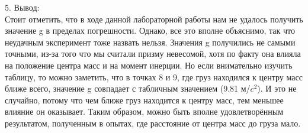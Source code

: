\documentclass[12pt, a4paper]{article}
\begin{document}
    
            {\Large 5. Вывод: \\}
            Стоит отметить, что в ходе данной лабораторной работы нам не удалось получить значение g
            в пределах погрешности. Однако, все это вполне объяснимо, так что неудачным эксперимент
            тоже назвать нельзя. Значения g получились не самыми точными, из-за того что мы считали 
            призму невесомой, хотя по факту она влияла на положение центра масс и на момент инерции.
            Но если внимательно изучить таблицу, то можно заметить, что в точках 8 и 9, где груз находился
            к центру масс ближе всего, значение g совпадает с табличным значением (9.81 м/$c^2$). И это не
            случайно, потому что чем ближе груз находится к центру масс, тем меньшее влияние он оказывает.
            Таким образом, можно быть вполне удовлетворённым результатом, полученным в опытах, где расстояние
            от центра масс до груза мало.    
\end{document}
